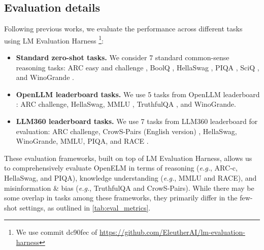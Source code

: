 \documentclass[10pt,twocolumn,letterpaper]{article}
\makeatletter
\newcommand{\model}{OpenELM\@\xspace}
\makeatother
\begin{document}
\subsection{Evaluation details}
\label{ssec:evaluation_details}
Following previous works, we evaluate the performance across different tasks using LM Evaluation Harness \cite{eval-harness}\footnote{We use commit dc90fec of \url{https://github.com/EleutherAI/lm-evaluation-harness}}:
\begin{itemize}[leftmargin=*]
    \item \textbf{Standard zero-shot tasks.} We consider 7 standard common-sense reasoning tasks: ARC easy and challenge \cite{clark2018think}, BoolQ \cite{clark2019boolq}, HellaSwag \cite{zellers2019hellaswag}, PIQA \cite{bisk2020piqa}, SciQ \cite{welbl2017crowdsourcing}, and WinoGrande \cite{sakaguchi2021winogrande}. 
    \item \textbf{OpenLLM leaderboard tasks.} We use 5 tasks from OpenLLM leaderboard \cite{open-llm-leaderboard}: ARC challenge, HellaSwag, MMLU \cite{hendrycks2020measuring}, TruthfulQA \cite{lin2021truthfulqa}, and WinoGrande.
    \item \textbf{LLM360 leaderboard tasks.} We use 7 tasks from LLM360 leaderboard \cite{liu2023llm360} for evaluation: ARC challenge, CrowS-Pairs (English version) \cite{nangia2020crows}, HellaSwag, WinoGrande, MMLU, PIQA, and RACE \cite{lai2017race}.
\end{itemize}
These evaluation frameworks, built on top of LM Evaluation Harness, allows us to comprehensively evaluate \model in terms of reasoning (\textit{e.g.}, ARC-c, HellaSwag, and PIQA), knowledge understanding (\textit{e.g.}, MMLU and RACE), and misinformation \& bias (\textit{e.g.}, TruthfulQA and CrowS-Pairs). While there may be some overlap in tasks among these frameworks, they primarily differ in the few-shot settings, as outlined in \cref{tab:eval_metrics}.
\end{document}
